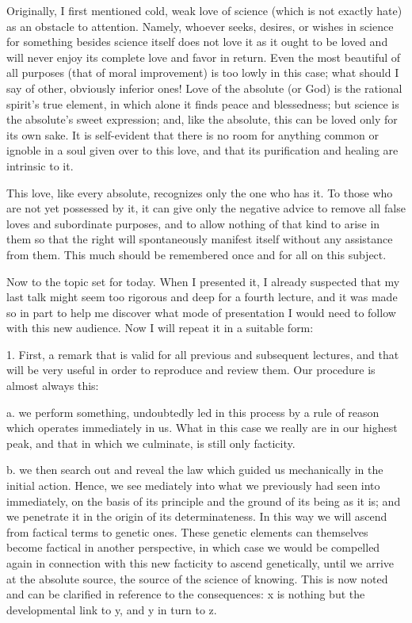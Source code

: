Originally, I first mentioned cold, weak love of science
(which is not exactly hate) as an obstacle to attention.
Namely, whoever seeks, desires, or wishes in science
for something besides science itself does not love it
as it ought to be loved and will never enjoy
its complete love and favor in return.
Even the most beautiful of all purposes
(that of moral improvement)
is too lowly in this case;
what should I say of other, obviously inferior ones!
Love of the absolute (or God) is the rational spirit's true element,
in which alone it finds peace and blessedness;
but science is the absolute's sweet expression;
and, like the absolute, this can be loved only for its own sake.
It is self-evident that there is no room for anything
common or ignoble in a soul given over to this love,
and that its purification and healing are intrinsic to it.

This love, like every absolute,
recognizes only the one who has it.
To those who are not yet possessed by it,
it can give only the negative advice to remove
all false loves and subordinate purposes,
and to allow nothing of that kind to arise in them
so that the right will spontaneously manifest itself
without any assistance from them.
This much should be remembered
once and for all on this subject.

Now to the topic set for today.
When I presented it, I already suspected that
my last talk might seem too rigorous and
deep for a fourth lecture,
and it was made so in part to help me
discover what mode of presentation
I would need to follow with this new audience.
Now I will repeat it in a suitable form:

1. First, a remark that is valid
for all previous and subsequent lectures,
and that will be very useful in order
to reproduce and review them.
Our procedure is almost always this:

a. we perform something, undoubtedly led in this process
by a rule of reason which operates immediately in us.
What in this case we really are in our highest peak,
and that in which we culminate, is still only facticity.

b. we then search out and reveal the law
which guided us mechanically in the initial action.
Hence, we see mediately into what we previously
had seen into immediately,
on the basis of its principle
and the ground of its being as it is;
and we penetrate it in the origin
of its determinateness.
In this way we will ascend
from factical terms to genetic ones.
These genetic elements can themselves
become factical in another perspective,
in which case we would be compelled again
in connection with this new facticity
to ascend genetically,
until we arrive at the absolute source,
the source of the science of knowing.
This is now noted and can be clarified
in reference to the consequences:
x is nothing but the developmental link to y,
and y in turn to z.

